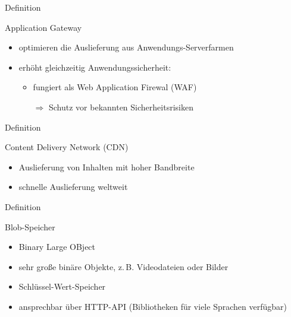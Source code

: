 \documentclass{scrartcl}
\newenvironment{flashcard}[2][]{%
    #1
    \vfill
    \centerline{\Large{#2}}
    \vfill
\newpage
}
{\newpage}
\begin{document}
    \begin{flashcard}[Definition]{Application Gateway}
        \begin{itemize}
            \item optimieren die Auslieferung aus Anwendungs-Serverfarmen
            \item erhöht gleichzeitig Anwendungssicherheit:
            \begin{itemize}
                \item fungiert als Web Application Firewal (WAF)
                \item[$\Rightarrow$] Schutz vor bekannten Sicherheitsrisiken
            \end{itemize}
        \end{itemize}

    \end{flashcard}

    \begin{flashcard}[Definition]{Content Delivery Network (CDN)}
        \begin{itemize}
            \item Auslieferung von Inhalten mit hoher Bandbreite
            \item schnelle Auslieferung weltweit
        \end{itemize}
    \end{flashcard}

    \begin{flashcard}[Definition]{Blob-Speicher}
        \begin{itemize}
            \item Binary Large OBject
            \item sehr große binäre Objekte, z.\,B. Videodateien oder Bilder
            \item Schlüssel-Wert-Speicher
            \item ansprechbar über HTTP-API (Bibliotheken für viele Sprachen verfügbar)
        \end{itemize}

    \end{flashcard}
\end{document}
